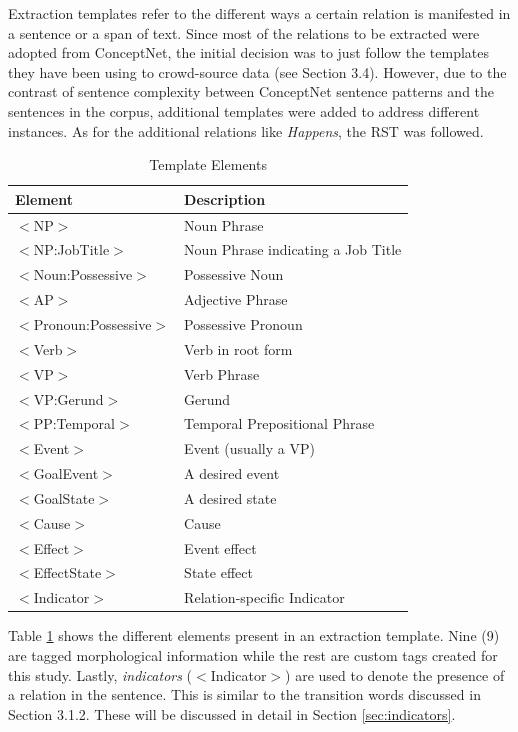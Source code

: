 Extraction templates refer to the different ways a certain relation is manifested in a sentence or a span of text. Since most of the relations to be extracted were adopted from ConceptNet, the initial decision was to just follow the templates they have been using to crowd-source data (see Section 3.4). However, due to the contrast of sentence complexity between ConceptNet sentence patterns and the sentences in the corpus, additional templates were added to address different instances. As for the additional relations like \textit{Happens}, the RST was followed.

\begin{table}[H]   %
\centering
\caption{Template Elements} \vspace{0.25em}
\begin{tabular}{|p{4cm}|p{6.5cm}|} \hline
\textbf{Element} & \textbf{Description} \\ \hline
$<$NP$>$					& Noun Phrase \\ \hline
$<$NP:JobTitle$>$			& Noun Phrase indicating a Job Title \\ \hline
$<$Noun:Possessive$>$		& Possessive Noun \\ \hline
$<$AP$>$					& Adjective Phrase \\ \hline
$<$Pronoun:Possessive$>$	& Possessive Pronoun \\ \hline
$<$Verb$>$					& Verb in root form \\ \hline
$<$VP$>$					& Verb Phrase \\ \hline
$<$VP:Gerund$>$				& Gerund \\ \hline
$<$PP:Temporal$>$			& Temporal Prepositional Phrase \\ \hline
$<$Event$>$					& Event (usually a VP) \\ \hline
$<$GoalEvent$>$				& A desired event \\ \hline
$<$GoalState$>$				& A desired state \\ \hline
$<$Cause$>$					& Cause \\ \hline
$<$Effect$>$				& Event effect \\ \hline
$<$EffectState$>$			& State effect \\ \hline
$<$Indicator$>$				& Relation-specific Indicator \\ \hline
\end{tabular}
\label{tab:templateelements}
\end{table}

Table \ref{tab:templateelements} shows the different elements present in an extraction template. Nine (9) are tagged morphological information while the rest are custom tags created for this study. Lastly, \textit{indicators} ($<$Indicator$>$) are used to denote the presence of a relation in the sentence. This is similar to the transition words discussed in Section 3.1.2. These will be discussed in detail in Section  \ref{sec:indicators}.

